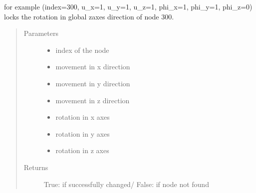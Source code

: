 \documentclass[letterpaper,10pt,english]{sphinxmanual}
\begin{document}
\begin{fulllineitems}
\begin{fulllineitems}
\begin{description}
\end{description}

for example (index=300, u\_x=1, u\_y=1, u\_z=1, phi\_x=1, phi\_y=1, phi\_z=0) locks the rotation
in global z\sphinxhyphen{}axes direction of node 300.
\begin{quote}\begin{description}
\item[{Parameters}] \leavevmode\begin{itemize}
\item {} 
 \textendash{} index of the node

\item {} 
 \textendash{} movement in x direction

\item {} 
 \textendash{} movement in y direction

\item {} 
 \textendash{} movement in z direction

\item {} 
 \textendash{} rotation in x axes

\item {} 
 \textendash{} rotation in y axes

\item {} 
 \textendash{} rotation in z axes

\end{itemize}

\item[{Returns}] \leavevmode
True: if successfully changed/ False: if node not found

\end{description}\end{quote}

\end{fulllineitems}



\end{fulllineitems}
\end{document}
